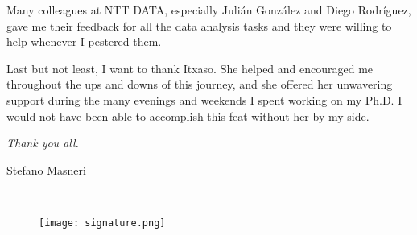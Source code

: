 \begin{acknowledgementslong}
Many colleagues at NTT DATA, especially Julián González and Diego Rodríguez, gave me their feedback for all the data analysis tasks and they were willing to help whenever I pestered them.

Last but not least, I want to thank Itxaso. She helped and encouraged me throughout the ups and downs of this journey, and she offered her unwavering support during the many evenings and weekends I spent working on my Ph.D. I would not have been able to accomplish this feat without her by my side.

\begin{flushright}

\textit{Thank you all.}

Stefano Masneri

\monthname \ \the\year



\begin{figure}[htbp!]
\hfill\begin{minipage}{.5\textwidth}\centering
\texttt{[image: signature.png]}
\end{minipage}
\end{figure}
%



\end{flushright}



\end{acknowledgementslong}

